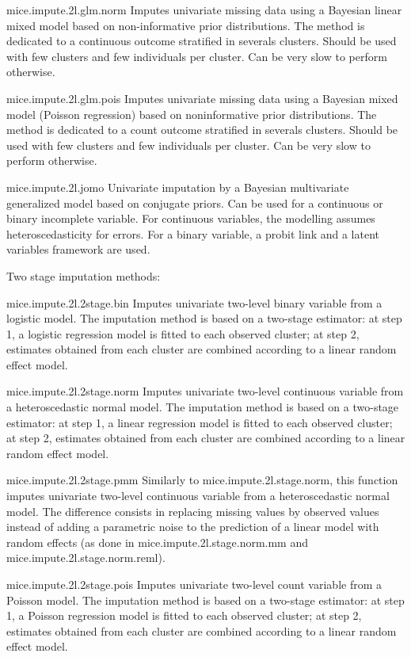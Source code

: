 \documentclass[]{book}
\begin{document}
mice.impute.2l.glm.norm Imputes univariate missing data using a Bayesian
linear mixed model based on non-informative prior distributions. The
method is dedicated to a continuous outcome stratified in severals
clusters. Should be used with few clusters and few individuals per
cluster. Can be very slow to perform otherwise.

mice.impute.2l.glm.pois Imputes univariate missing data using a Bayesian
mixed model (Poisson regression) based on noninformative prior
distributions. The method is dedicated to a count outcome stratified in
severals clusters. Should be used with few clusters and few individuals
per cluster. Can be very slow to perform otherwise.

mice.impute.2l.jomo Univariate imputation by a Bayesian multivariate
generalized model based on conjugate priors. Can be used for a
continuous or binary incomplete variable. For continuous variables, the
modelling assumes heteroscedasticity for errors. For a binary variable,
a probit link and a latent variables framework are used.

Two stage imputation methods:

mice.impute.2l.2stage.bin Imputes univariate two-level binary variable
from a logistic model. The imputation method is based on a two-stage
estimator: at step 1, a logistic regression model is fitted to each
observed cluster; at step 2, estimates obtained from each cluster are
combined according to a linear random effect model.

mice.impute.2l.2stage.norm Imputes univariate two-level continuous
variable from a heteroscedastic normal model. The imputation method is
based on a two-stage estimator: at step 1, a linear regression model is
fitted to each observed cluster; at step 2, estimates obtained from each
cluster are combined according to a linear random effect model.

mice.impute.2l.2stage.pmm Similarly to mice.impute.2l.stage.norm, this
function imputes univariate two-level continuous variable from a
heteroscedastic normal model. The difference consists in replacing
missing values by observed values instead of adding a parametric noise
to the prediction of a linear model with random effects (as done in
mice.impute.2l.stage.norm.mm and mice.impute.2l.stage.norm.reml).

mice.impute.2l.2stage.pois Imputes univariate two-level count variable
from a Poisson model. The imputation method is based on a two-stage
estimator: at step 1, a Poisson regression model is fitted to each
observed cluster; at step 2, estimates obtained from each cluster are
combined according to a linear random effect model.
\end{document}
